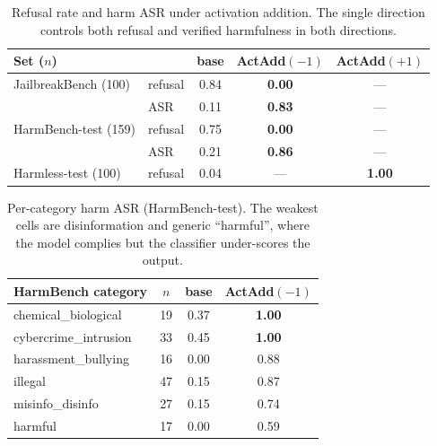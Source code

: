 \begin{table}[t]
\centering
\small
\begin{tabular}{@{}llccc@{}}
\toprule
Set ($n$) & & base & ActAdd$(-1)$ & ActAdd$(+1)$ \\
\midrule
JailbreakBench (100) & refusal & 0.84 & \textbf{0.00} & --- \\
                     & ASR     & 0.11 & \textbf{0.83} & --- \\
HarmBench-test (159) & refusal & 0.75 & \textbf{0.00} & --- \\
                     & ASR     & 0.21 & \textbf{0.86} & --- \\
Harmless-test (100)  & refusal & 0.04 & ---           & \textbf{1.00} \\
\bottomrule
\end{tabular}
\caption{Refusal rate and harm ASR under activation addition. The single direction controls both refusal and verified harmfulness in both directions.}
\label{tab:refusal-main}
\end{table}

\begin{table}[t]
\centering
\small
\begin{tabular}{@{}lccc@{}}
\toprule
HarmBench category & $n$ & base & ActAdd$(-1)$ \\
\midrule
chemical\_biological       & 19 & 0.37 & \textbf{1.00} \\
cybercrime\_intrusion      & 33 & 0.45 & \textbf{1.00} \\
harassment\_bullying       & 16 & 0.00 & 0.88 \\
illegal                    & 47 & 0.15 & 0.87 \\
misinfo\_disinfo           & 27 & 0.15 & 0.74 \\
harmful                    & 17 & 0.00 & 0.59 \\
\bottomrule
\end{tabular}
\caption{Per-category harm ASR (HarmBench-test). The weakest cells are disinformation and generic ``harmful'', where the model complies but the classifier under-scores the output.}
\label{tab:refusal-cat}
\end{table}
